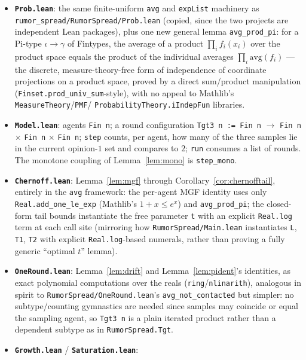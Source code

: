 \documentclass[11pt]{article}
\begin{document}
\begin{itemize}[leftmargin=2em]
\item \textbf{\texttt{Prob.lean}}: the same finite-uniform \texttt{avg} and
  \texttt{expList} machinery as \texttt{rumor\_spread/RumorSpread/Prob.lean}
  (copied, since the two projects are independent Lean packages), plus one
  new general lemma \texttt{avg\_prod\_pi}: for a Pi-type $\iota \to \gamma$
  of Fintypes, the average of a product $\prod_i f_i(x_i)$ over the product
  space equals the product of the individual averages $\prod_i
  \mathrm{avg}(f_i)$ — the discrete, measure-theory-free form of
  independence of coordinate projections on a product space, proved by a
  direct sum/product manipulation (\texttt{Finset.prod\_univ\_sum}-style),
  with no appeal to Mathlib's \texttt{MeasureTheory}/\texttt{PMF}/
  \texttt{ProbabilityTheory.iIndepFun} libraries.
\item \textbf{\texttt{Model.lean}}: agents \texttt{Fin n}; a round
  configuration \texttt{Tgt3 n := Fin n} $\to$ \texttt{Fin n} $\times$
  \texttt{Fin n} $\times$ \texttt{Fin n}; \texttt{step} counts, per agent,
  how many of the three samples lie in the current opinion-$1$ set and
  compares to $2$; \texttt{run} consumes a list of rounds. The monotone
  coupling of Lemma~\ref{lem:mono} is \texttt{step\_mono}.
\item \textbf{\texttt{Chernoff.lean}}: Lemma~\ref{lem:mgf} through
  Corollary~\ref{cor:chernofftail}, entirely in the \texttt{avg} framework:
  the per-agent MGF identity uses only \texttt{Real.add\_one\_le\_exp}
  (Mathlib's $1+x\le e^x$) and \texttt{avg\_prod\_pi}; the closed-form tail
  bounds instantiate the free parameter \texttt{t} with an explicit
  \texttt{Real.log} term at each call site (mirroring how
  \texttt{RumorSpread/Main.lean} instantiates \texttt{L}, \texttt{T1},
  \texttt{T2} with explicit \texttt{Real.log}-based numerals, rather than
  proving a fully generic ``optimal $t$'' lemma).
\item \textbf{\texttt{OneRound.lean}}: Lemma~\ref{lem:drift} and
  Lemma~\ref{lem:pident}'s identities, as exact polynomial computations
  over the reals (\texttt{ring}/\texttt{nlinarith}), analogous in spirit to
  \texttt{RumorSpread/OneRound.lean}'s \texttt{avg\_not\_contacted} but
  simpler: no subtype/counting gymnastics are needed since samples may
  coincide or equal the sampling agent, so \texttt{Tgt3 n} is a plain
  iterated product rather than a dependent subtype as in
  \texttt{RumorSpread.Tgt}.
\item \textbf{\texttt{Growth.lean}} / \textbf{\texttt{Saturation.lean}}:

\end{itemize}
\end{document}
